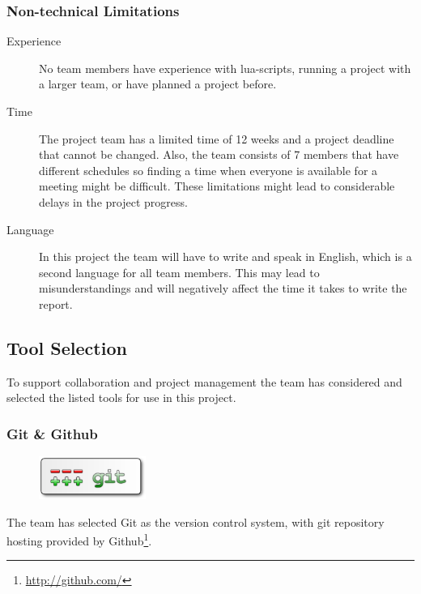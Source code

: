 \subsubsection{Non-technical Limitations}
\begin{description}
	\item[Experience] No team members have experience with \Gls{lua}-\glspl{script},
		running a project with a larger team, or have planned a project before.
	\item[Time] The project team has a limited time of 12 weeks and a project
		deadline that cannot be changed. Also, the team consists of 7 members
		that have different schedules so finding a time when everyone is
		available for a meeting might be difficult. These limitations might
		lead to considerable delays in the project progress.
	\item[Language] In this project the team will have to write and speak in
		English, which is a second language for all team members. This may
		lead to misunderstandings and will negatively affect the time it
		takes to write the report.
\end{description}

\subsection{Tool Selection}
To support collaboration and project management the team has considered and
selected the listed tools for use in this project.

\subsubsection{Git \& Github}
\begin{figure}
	\vspace{-20pt}
	\includegraphics[width=3.5cm]{./planning/img/git_logo}
	\vspace{-20pt}
\end{figure}
The team has selected Git as the \gls{version control system}, with git \gls{repository}
hosting provided by Github\footnote{\url{http://github.com/}}.


